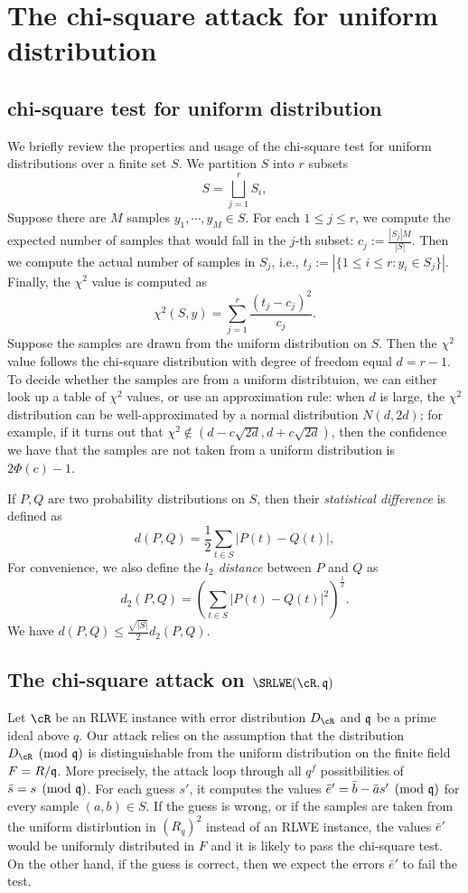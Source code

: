 \documentclass{amsart}
\begin{document}
\section{The chi-square attack for uniform distribution}
\label{sec: chi-square}
\subsection{chi-square test for uniform distribution}
We briefly review the properties and usage of the chi-square test for uniform distributions over a finite set $S$.  We partition $S$ into $r$ subsets
\[
    S = \bigsqcup_{j=1}^r S_i,
\]
Suppose there are $M$ samples $y_1, \cdots, y_M \in S$.
For each $1 \leq j \leq r$, we compute the expected number of samples that would fall in the $j$-th subset: $c_j := \frac{|S_j|M}{|S|}$. Then we compute the actual number of samples in $S_j$, i.e., $t_j := |\{1 \leq i \leq r: y_i \in S_j\}|$. Finally, the $\chi^2$ value is computed as
\[
    \chi^2(S,y) = \sum_{j = 1}^r \frac{(t_j -c_j)^2}{c_j}.
\]
Suppose the samples are drawn from the uniform distribution on $S$. Then the $\chi^2$ value follows the chi-square distribution with degree of freedom equal $d = r-1$.
To decide whether the samples are from a uniform distribtuion, we can either look up a table of $\chi^2$ values, or use an approximation rule:  when $d$ is large, the $\chi^2$ distribution can be well-approximated by a normal distribution $N(d, 2d)$; for example, if it turns out that $\chi^2 \notin (d - c \sqrt{2d}, d+ c \sqrt{2d})$, then the confidence we have that the samples are not taken from a uniform distribution is $2\Phi(c) - 1$.

If $P,Q$ are two probability distributions on $S$, then their {\it statistical difference} is defined as
\[
    d(P,Q) = \frac{1}{2} \sum_{t \in S} |P(t) - Q(t)|,
\]
For convenience, we also define the {\it $l_2$ distance} between $P$ and $Q$ as
\[
    d_2(P,Q) = (\sum_{t \in S} |P(t) - Q(t)|^2)^{\frac{1}{2}}.
\]
We have $d(P,Q) \leq \frac{\sqrt{|S|}}{2}d_2(P,Q)$.



\subsection{The chi-square attack on $\SRLWE(\cR,\fq)$}

Let $\cR$ be an RLWE instance with error distribution $D_{\cR}$ and $\mathfrak{q}$ be a prime ideal above $q$.  Our attack relies on the assumption that the distribution $D_\cR \pmod {\fq}$ is distinguishable from the uniform distribution on the finite field $F = R/\mathfrak{q}$. More precisely, the attack loop through all $q^f$ possitbilities of $\bar{s} = s \pmod{\mathfrak{q}}$. For each guess $s'$, it computes the values $\bar{e}' = \bar{b} - \bar{a} s' \pmod {\mathfrak{q}}$ for every sample $(a,b) \in S$. If the guess is wrong, or if the samples are taken from the uniform distirbution in $(R_q)^2$ instead of an RLWE instance, the values $\bar{e}'$ would be uniformly distributed in $F$ and it is likely to pass the chi-square test. On the other hand, if the guess is correct, then we expect the errors $\bar{e}'$ to fail the test.
\end{document}
